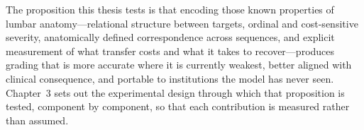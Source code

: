 The proposition this thesis tests is that encoding those known properties of
lumbar anatomy---relational structure between targets, ordinal and
cost-sensitive severity, anatomically defined correspondence across sequences,
and explicit measurement of what transfer costs and what it takes to
recover---produces grading that is more accurate where it is currently weakest,
better aligned with clinical consequence, and portable to institutions the model
has never seen. Chapter~3 sets out the experimental design through which that
proposition is tested, component by component, so that each contribution is
measured rather than assumed.

\printbibliography[heading=bibintoc,title={References}]


